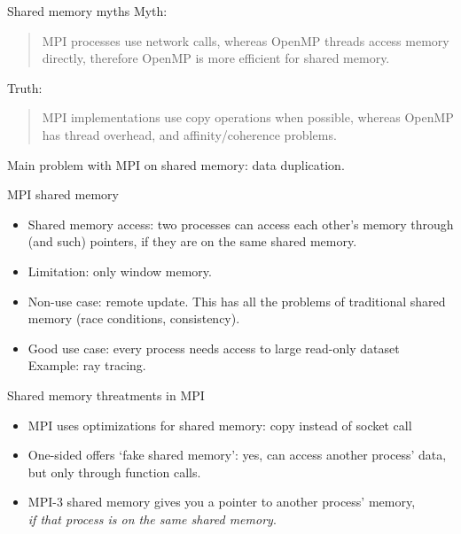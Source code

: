 
\begin{numberedframe}{Shared memory myths}
  Myth:
  \begin{quote}
    MPI processes use network calls, whereas OpenMP threads access memory directly,
    therefore OpenMP is more efficient for shared memory.
  \end{quote}
  Truth:
  \begin{quote}
    MPI implementations use copy operations when possible, whereas OpenMP
    has thread overhead, and affinity/coherence problems.
  \end{quote}
  Main problem with MPI on shared memory: data duplication.
\end{numberedframe}

\begin{numberedframe}{MPI shared memory}
  \begin{itemize}
  \item Shared memory access: two processes can access each other's
    memory through  (and such) pointers, if they are
    on the same shared memory.
  \item Limitation: only window memory.
  \item Non-use case: remote update. This has all the problems of
    traditional shared memory (race conditions, consistency).
  \item Good use case: every process needs access to large read-only
    dataset\\ Example: ray tracing.
  \end{itemize}
\end{numberedframe}

\begin{numberedframe}{Shared memory threatments in MPI}
  \begin{itemize}
  \item MPI uses optimizations for shared memory: copy instead of
    socket call
  \item One-sided offers `fake shared memory': yes, can access another
    process' data, but only through function calls.
  \item MPI-3 shared memory gives you a pointer to another process'
    memory,\\
    \emph{if that process is on the same shared memory}.
  \end{itemize}
\end{numberedframe}

